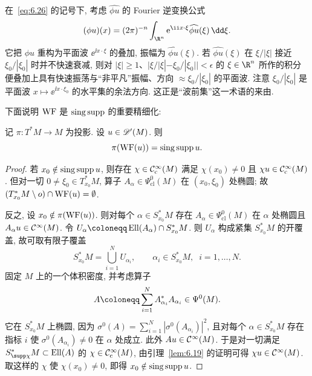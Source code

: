 \begin{remark}[解释]\label{rem:6.22}
在~\eqref{eq:6.26} 的记号下, 考虑 $\widehat{\phi u}$ 的 Fourier 逆变换公式
\begin{equation}\label{eq:6.31}
    (\phi u)(x) = (2\pi)^{-n} \int_{\R^n} \ee^{\ii x \cdot \xi} \widehat{\phi u}(\xi) \,\dd\xi.
\end{equation}
它把 $\phi u$ 重构为平面波 $\ee^{\ii x \cdot \xi}$ 的叠加, 振幅为 $\widehat{\phi u}(\xi)$. 若 $\widehat{\phi u}(\xi)$ 在 $\xi/|\xi|$ 接近 $\xi_0/|\xi_0|$ 时并不快速衰减, 则对 $|\xi| \ge 1$、$|\xi/|\xi| - \xi_0/|\xi_0|| < \epsilon$ 的 $\xi \in \R^n$ 所作的积分便叠加上具有快速振荡与``非平凡''振幅、方向 $\approx \xi_0/|\xi_0|$ 的平面波. 注意 $\xi_0/|\xi_0|$ 是平面波 $x \mapsto \ee^{\ii x \cdot \xi_0}$ 的水平集的余法方向. 这正是``波前集''这一术语的来由.
\end{remark}

下面说明 $\operatorname{WF}$ 是 $\operatorname{sing\,supp}$ 的重要精细化:

\begin{theorem}[波前集与奇异支集]\label{thm:6.23}
记 $\pi \colon T^* M \to M$ 为投影. 设 $u \in \mathscr{D}'(M)$. 则
\begin{equation}\label{eq:6.32}
    \pi(\operatorname{WF}(u)) = \operatorname{sing\,supp} u.
\end{equation}
\end{theorem}

\begin{proof}
若 $x_0 \notin \operatorname{sing\,supp} u$, 则存在 $\chi \in \mathcal{C}_{\mathrm{c}}^\infty(M)$ 满足 $\chi(x_0) \neq 0$ 且 $\chi u \in \mathcal{C}_{\mathrm{c}}^\infty(M)$. 但对一切 $0 \neq \xi_0 \in T^*_{x_0} M$, 算子 $A_\alpha \in \Psi_{\mathrm{cl}}^0(M)$ 在 $(x_0, \xi_0)$ 处椭圆; 故 $(T^*_{x_0} M \setminus o) \cap \operatorname{WF}(u) = \emptyset$.

反之, 设 $x_0 \notin \pi(\operatorname{WF}(u))$. 则对每个 $\alpha \in S^*_{x_0} M$ 存在 $A_\alpha \in \Psi_{\mathrm{cl}}^0(M)$ 在 $\alpha$ 处椭圆且 $A_\alpha u \in \mathcal{C}^\infty(M)$. 令 $U_\alpha \defeq \Ell(A_\alpha) \cap S^*_{x_0} M$. 则 $U_\alpha$ 构成紧集 $S^*_{x_0} M$ 的开覆盖, 故可取有限子覆盖
\begin{equation}\label{eq:6.33}
    S^*_{x_0} M = \bigcup_{i=1}^N U_{\alpha_i}, \qquad \alpha_i \in S^*_{x_0} M, \;\; i = 1, \ldots, N.
\end{equation}
固定 $M$ 上的一个体积密度, 并考虑算子
\begin{equation}\label{eq:6.34}
    A \defeq \sum_{i=1}^N A^*_{\alpha_i} A_{\alpha_i} \in \Psi^0(M).
\end{equation}
它在 $S^*_{x_0} M$ 上椭圆, 因为 $\sigma^0(A) = \sum_{i=1}^N |\sigma^0(A_{\alpha_i})|^2$, 且对每个 $\alpha \in S^*_{x_0} M$ 存在指标 $i$ 使 $\sigma^0(A_{\alpha_i}) \neq 0$ 在 $\alpha$ 处成立. 此外 $A u \in \mathcal{C}^\infty(M)$. 于是对一切满足 $S^*_{\supp\chi} M \subset \Ell(A)$ 的 $\chi \in \mathcal{C}_{\mathrm{c}}^\infty(M)$, 由引理~\ref{lem:6.19} 的证明可得 $\chi u \in \mathcal{C}^\infty(M)$. 取这样的 $\chi$ 使 $\chi(x_0) \neq 0$, 即得 $x_0 \notin \operatorname{sing\,supp} u$.
\end{proof}


